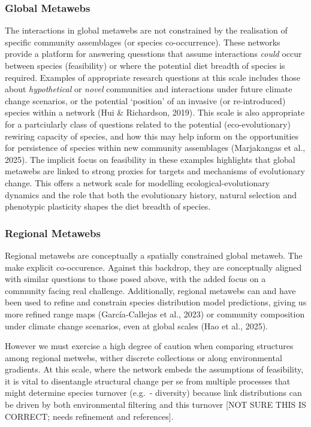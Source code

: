 \documentclass[
]{article}
\begin{document}
\subsubsection{Global Metawebs}\label{global-metawebs}

The interactions in global metawebs are not constrained by the
realisation of specific community assemblages (or species
co-occurrence). These networks provide a platform for answering
quesstions that assume interactions \emph{could} occur between species
(feasibility) or where the potential diet breadth of species is
required. Examples of appropriate research questions at this scale
includes those about \emph{hypothetical} or \emph{novel} communities and
interactions under future climate change scenarios, or the potential
`position' of an invasive (or re-introduced) species within a network
(Hui \& Richardson, 2019). This scale is also appropriate for a
partciularly class of questions related to the potential
(eco-evolutionary) rewiring capacity of species, and how this may help
inform on the opportunities for persistence of species within new
community assemblages (Marjakangas et al., 2025). The implicit focus on
feasibility in these examples highlights that global metawebs are linked
to strong proxies for targets and mechanisms of evolutionary change.
This offers a network scale for modelling ecological-evolutionary
dynamics and the role that both the evolutionary history, natural
selection and phenotypic plasticity shapes the diet breadth of species.

\subsubsection{Regional Metawebs}\label{regional-metawebs}

Regional metawebs are conceptually a spatially constrained global
metaweb. The make explicit co-occurence. Against this backdrop, they are
conceptually aligned with similar questions to those posed above, with
the added focus on a community facing real challenge. Additionally,
regional metawebs can and have been used to refine and constrain species
distribution model predictions, giving us more refined range maps
(García-Callejas et al., 2023) or community composition under climate
change scenarios, even at global scales (Hao et al., 2025).

However we must exercise a high degree of caution when comparing
structures among regional metwebs, wither discrete collections or along
environmental gradients. At this scale, where the network embeds the
assumptions of feasibility, it is vital to disentangle structural change
per se from multiple processes that might determine species turnover
(e.g.~\beta - diversity) because link distributions can be driven by
both environmental filtering and this turnover {[}NOT SURE THIS IS
CORRECT; needs refinement and references{]}.
\end{document}

